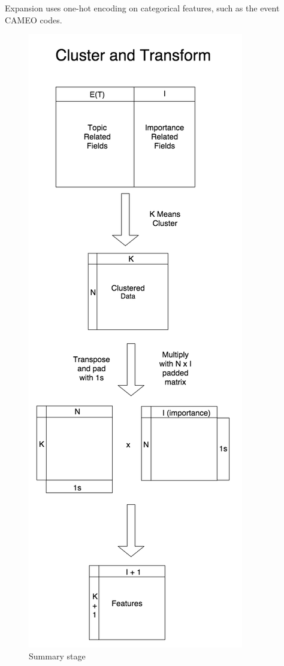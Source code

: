Expansion uses one-hot encoding on categorical features, such as the event CAMEO codes.


\begin{figure}[ht]
\vskip 0.2in
\begin{center}
\centerline{\includegraphics[scale=0.15]{images/cluster_and_transform_vertical.png}}
\caption{Summary stage}
\end{center}
\vskip -0.2in
\label{fig:summarization}
\end{figure}

